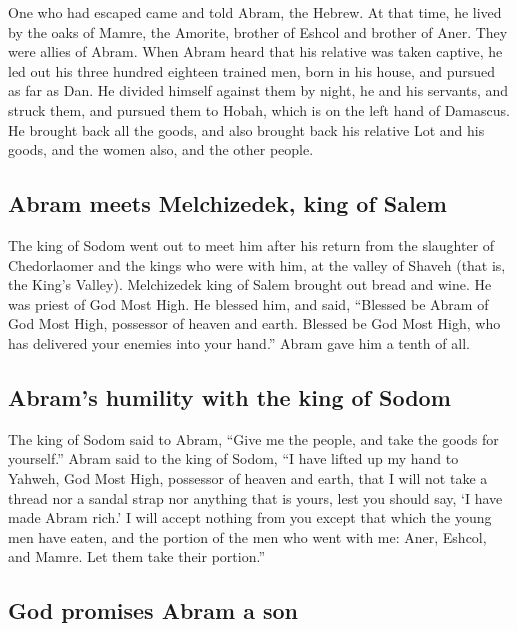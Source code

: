  One who had escaped came and told Abram, the Hebrew. At
that time, he lived by the oaks of Mamre, the Amorite, brother of Eshcol
and brother of Aner. They were allies of Abram.  When
Abram heard that his relative was taken captive, he led out his three
hundred eighteen trained men, born in his house, and pursued as far as
Dan.  He divided himself against them by night, he and
his servants, and struck them, and pursued them to Hobah, which is on
the left hand of Damascus.  He brought back all the
goods, and also brought back his relative Lot and his goods, and the
women also, and the other people.

\hypertarget{abram-meets-melchizedek-king-of-salem}{%
\subsection{Abram meets Melchizedek, king of
Salem}\label{abram-meets-melchizedek-king-of-salem}}

 The king of Sodom went out to meet him after his return
from the slaughter of Chedorlaomer and the kings who were with him, at
the valley of Shaveh (that is, the King's Valley). 
Melchizedek king of Salem brought out bread and wine. He was priest of
God Most High.  He blessed him, and said, ``Blessed be
Abram of God Most High, possessor of heaven and earth. 
Blessed be God Most High, who has delivered your enemies into your
hand.'' Abram gave him a tenth of all.

\hypertarget{abrams-humility-with-the-king-of-sodom}{%
\subsection{Abram's humility with the king of
Sodom}\label{abrams-humility-with-the-king-of-sodom}}

 The king of Sodom said to Abram, ``Give me the people,
and take the goods for yourself.''  Abram said to the
king of Sodom, ``I have lifted up my hand to Yahweh, God Most High,
possessor of heaven and earth,  that I will not take a
thread nor a sandal strap nor anything that is yours, lest you should
say, `I have made Abram rich.'  I will accept nothing
from you except that which the young men have eaten, and the portion of
the men who went with me: Aner, Eshcol, and Mamre. Let them take their
portion.''

\hypertarget{god-promises-abram-a-son}{%
\subsection{God promises Abram a son}\label{god-promises-abram-a-son}}

